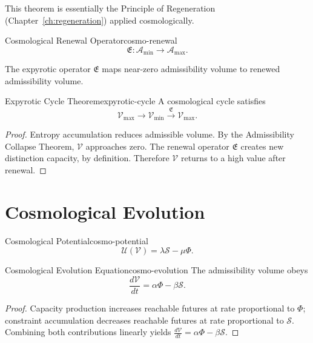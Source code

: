 \documentclass[12pt,twoside,openright]{book}
\begin{document}
This theorem is essentially the Principle of Regeneration
(Chapter~\ref{ch:regeneration}) applied
cosmologically.

\begin{definition}{Cosmological Renewal Operator}{cosmo-renewal}
  \[
    \mathfrak{E} : \mathcal{A}_{\min} \to \mathcal{A}_{\max}.
  \]
\end{definition}

The expyrotic operator $\mathfrak{E}$ maps near-zero
admissibility volume to renewed admissibility volume.

\begin{theorem}{Expyrotic Cycle Theorem}{expyrotic-cycle}
  A cosmological cycle satisfies
  \[
    \mathcal{V}_{\max} \to \mathcal{V}_{\min}
    \xrightarrow{\ \mathfrak{E}\ } \mathcal{V}_{\max}.
  \]
\end{theorem}

\begin{proof}
  Entropy accumulation reduces admissible volume. By the
  Admissibility Collapse Theorem, $\mathcal{V}$ approaches
  zero. The renewal operator $\mathfrak{E}$ creates new
  distinction capacity, by definition. Therefore
  $\mathcal{V}$ returns to a high value after renewal.
\end{proof}

\section{Cosmological Evolution}
\label{sec:ch18-evolution}

\begin{definition}{Cosmological Potential}{cosmo-potential}
  \[
    \mathcal{U}(\mathcal{V}) = \lambda \mathcal{S} - \mu \Phi.
  \]
\end{definition}

\begin{theorem}{Cosmological Evolution Equation}{cosmo-evolution}
  The admissibility volume obeys
  \[
    \frac{d\mathcal{V}}{dt} = \alpha \Phi - \beta \mathcal{S}.
  \]
\end{theorem}

\begin{proof}
  Capacity production increases reachable futures at rate
  proportional to $\Phi$; constraint accumulation decreases
  reachable futures at rate proportional to $\mathcal{S}$.
  Combining both contributions linearly yields
  $\frac{d\mathcal{V}}{dt} = \alpha\Phi - \beta\mathcal{S}$.
\end{proof}
\end{document}
